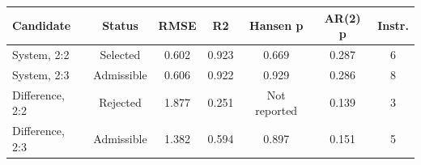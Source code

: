 \begin{tabular}{lcccccc}
\toprule
Candidate & Status & RMSE & R2 & Hansen p & AR(2) p & Instr. \\
\midrule
System, 2:2 & Selected & 0.602 & 0.923 & 0.669 & 0.287 & 6 \\
System, 2:3 & Admissible & 0.606 & 0.922 & 0.929 & 0.286 & 8 \\
Difference, 2:2 & Rejected & 1.877 & 0.251 & Not reported & 0.139 & 3 \\
Difference, 2:3 & Admissible & 1.382 & 0.594 & 0.897 & 0.151 & 5 \\
\bottomrule
\end{tabular}